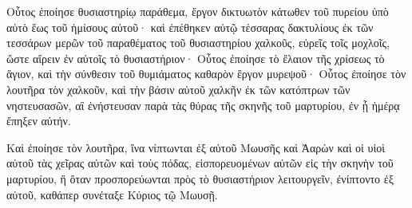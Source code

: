 {Οὗτος ἐποίησε θυσιαστηρίῳ παράθεμα, ἔργον δικτυωτὸν κάτωθεν τοῦ πυρείου ὑπὸ αὐτὸ ἕως τοῦ ἡμίσους αὐτοῦ· καὶ ἐπέθηκεν αὐτῷ τέσσαρας δακτυλίους ἐκ τῶν τεσσάρων μερῶν τοῦ παραθέματος τοῦ θυσιαστηρίου χαλκοῦς, εὐρεῖς τοῖς μοχλοῖς, ὥστε αἴρειν ἐν αὐτοῖς τὸ θυσιαστήριον·
Οὗτος ἐποίησε τὸ ἔλαιον τῆς χρίσεως τὸ ἅγιον, καὶ τὴν σύνθεσιν τοῦ θυμιάματος καθαρὸν ἔργον μυρεψοῦ·
Οὗτος ἐποίησε τὸν λουτῆρα τὸν χαλκοῦν, καὶ τὴν βάσιν αὐτοῦ χαλκῆν ἐκ τῶν κατόπτρων τῶν νηστευσασῶν, αἳ ἐνήστευσαν παρὰ τὰς θύρας τῆς σκηνῆς τοῦ μαρτυρίου, ἐν ᾗ ἡμέρᾳ ἔπηξεν αὐτήν.
\par }{\PP {}Καὶ ἐποίησε τὸν λουτῆρα, ἵνα νίπτωνται ἐξ αὐτοῦ Μωυσῆς καὶ Ἀαρὼν καὶ οἱ υἱοὶ αὐτοῦ τὰς χεῖρας αὐτῶν καὶ τοὺς πόδας, εἰσπορευομένων αὐτῶν εἰς τὴν σκηνὴν τοῦ μαρτυρίου, ἢ ὅταν προσπορεύωνται πρὸς τὸ θυσιαστήριον λειτουργεῖν, ἐνίπτοντο ἐξ αὐτοῦ, καθάπερ συνέταξε Κύριος τῷ Μωυσῇ.

}
